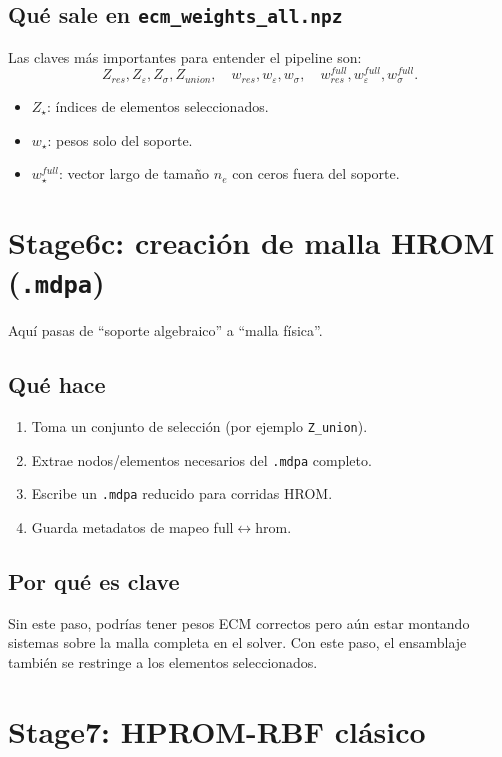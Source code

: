\documentclass[11pt,a4paper]{article}
\begin{document}
\subsection{Qué sale en \texttt{ecm\_weights\_all.npz}}
Las claves más importantes para entender el pipeline son:
\[
Z_{res},Z_{\varepsilon},Z_{\sigma},Z_{union},
\quad
w_{res},w_{\varepsilon},w_{\sigma},
\quad
w_{res}^{full},w_{\varepsilon}^{full},w_{\sigma}^{full}.
\]
\begin{itemize}[leftmargin=1.5em]
\item $Z_\star$: índices de elementos seleccionados.
\item $w_\star$: pesos solo del soporte.
\item $w_\star^{full}$: vector largo de tamaño $n_e$ con ceros fuera del soporte.
\end{itemize}

\section{Stage6c: creación de malla HROM (\texttt{.mdpa})}
Aquí pasas de ``soporte algebraico'' a ``malla física''.

\subsection{Qué hace}
\begin{enumerate}[leftmargin=1.5em]
\item Toma un conjunto de selección (por ejemplo \texttt{Z\_union}).
\item Extrae nodos/elementos necesarios del \texttt{.mdpa} completo.
\item Escribe un \texttt{.mdpa} reducido para corridas HROM.
\item Guarda metadatos de mapeo full$\leftrightarrow$hrom.
\end{enumerate}

\subsection{Por qué es clave}
Sin este paso, podrías tener pesos ECM correctos pero aún estar montando
sistemas sobre la malla completa en el solver.
Con este paso, el ensamblaje también se restringe a los elementos seleccionados.

\section{Stage7: HPROM-RBF clásico}
\end{document}
